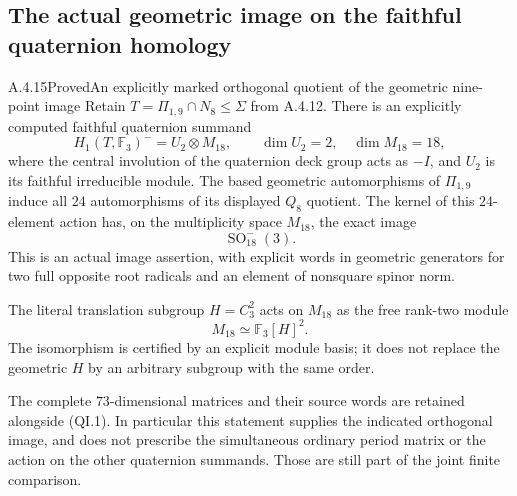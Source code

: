 \subsection{The actual geometric image on the faithful quaternion homology}

\begin{result}{A.4.15}{Proved}{An explicitly marked orthogonal quotient of the geometric nine-point image}
Retain $T=\Pi_{1,9}\cap N_8\leq\Sigma$ from A.4.12.
There is an explicitly computed faithful quaternion summand
\[
 H_1(T,\mathbb F_3)^-=U_2\otimes M_{18},\qquad
 \dim U_2=2,\quad\dim M_{18}=18,                         \tag{QI.1}
\]
where the central involution of the quaternion deck group
acts as $-I$, and $U_2$ is its faithful irreducible module.
The based geometric automorphisms of $\Pi_{1,9}$ induce
all $24$ automorphisms of its displayed $Q_8$ quotient.
The kernel of this $24$-element action has, on the
multiplicity space $M_{18}$, the exact image
\[
                         \operatorname{SO}_{18}^-(3).   \tag{QI.2}
\]
This is an actual image assertion, with explicit words in
geometric generators for two full opposite root radicals
and an element of nonsquare spinor norm.

The literal translation subgroup $H=C_3^2$ acts on
$M_{18}$ as the free rank-two module
\[
                       M_{18}\simeq\mathbb F_3[H]^2.     \tag{QI.3}
\]
The isomorphism is certified by an explicit module basis;
it does not replace the geometric $H$ by an arbitrary
subgroup with the same order.

The complete $73$-dimensional matrices and their source
words are retained alongside (QI.1).  In particular this
statement supplies the indicated orthogonal image, and
does not prescribe the simultaneous ordinary period
matrix or the action on the other quaternion summands.
Those are still part of the joint finite comparison.
\end{result}

